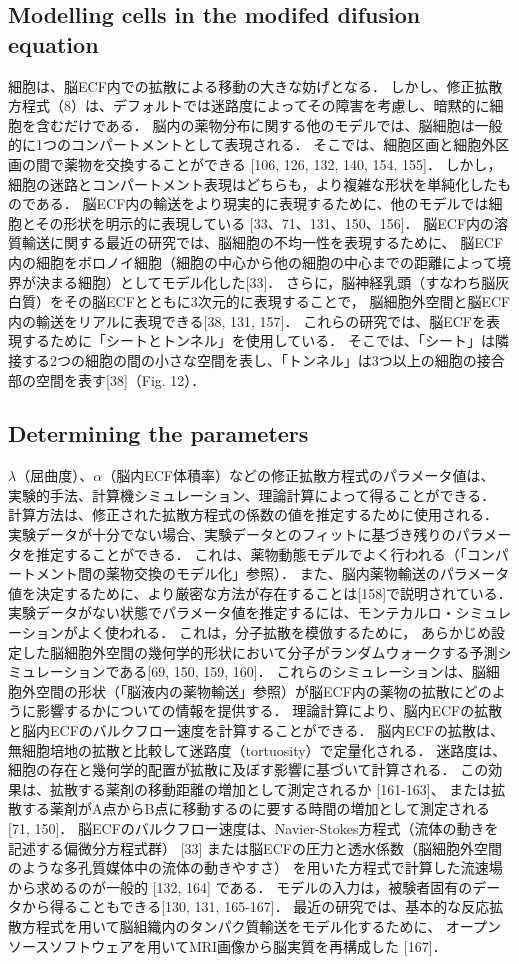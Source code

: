 \documentclass[11pt,a4paper]{jsarticle}
\begin{document}
\subsection{Modelling cells in the modifed difusion equation}
細胞は、脳ECF内での拡散による移動の大きな妨げとなる．
しかし、修正拡散方程式（8）は、デフォルトでは迷路度によってその障害を考慮し、暗黙的に細胞を含むだけである．
脳内の薬物分布に関する他のモデルでは、脳細胞は一般的に1つのコンパートメントとして表現される．
そこでは、細胞区画と細胞外区画の間で薬物を交換することができる [106, 126, 132, 140, 154, 155]．
しかし，細胞の迷路とコンパートメント表現はどちらも，より複雑な形状を単純化したものである．
脳ECF内の輸送をより現実的に表現するために、他のモデルでは細胞とその形状を明示的に表現している [33、71、131、150、156]．
脳ECF内の溶質輸送に関する最近の研究では、脳細胞の不均一性を表現するために、
脳ECF内の細胞をボロノイ細胞（細胞の中心から他の細胞の中心までの距離によって境界が決まる細胞）としてモデル化した[33]．
さらに，脳神経乳頭（すなわち脳灰白質）をその脳ECFとともに3次元的に表現することで，
脳細胞外空間と脳ECF内の輸送をリアルに表現できる[38, 131, 157]．
これらの研究では、脳ECFを表現するために「シートとトンネル」を使用している．
そこでは、「シート」は隣接する2つの細胞の間の小さな空間を表し、「トンネル」は3つ以上の細胞の接合部の空間を表す[38]（Fig. 12）．
\subsection{Determining the parameters}
$\lambda$（屈曲度）、$\alpha$（脳内ECF体積率）などの修正拡散方程式のパラメータ値は、
実験的手法、計算機シミュレーション、理論計算によって得ることができる．
計算方法は、修正された拡散方程式の係数の値を推定するために使用される．
実験データが十分でない場合、実験データとのフィットに基づき残りのパラメータを推定することができる．
これは、薬物動態モデルでよく行われる（「コンパートメント間の薬物交換のモデル化」参照）．
また、脳内薬物輸送のパラメータ値を決定するために、より厳密な方法が存在することは[158]で説明されている．
実験データがない状態でパラメータ値を推定するには、モンテカルロ・シミュレーションがよく使われる．
これは，分子拡散を模倣するために，
あらかじめ設定した脳細胞外空間の幾何学的形状において分子がランダムウォークする予測シミュレーションである[69, 150, 159, 160]．
これらのシミュレーションは、脳細胞外空間の形状（「脳液内の薬物輸送」参照）が脳ECF内の薬物の拡散にどのように影響するかについての情報を提供する．
理論計算により、脳内ECFの拡散と脳内ECFのバルクフロー速度を計算することができる．
脳内ECFの拡散は、無細胞培地の拡散と比較して迷路度（tortuosity）で定量化される．
迷路度は、細胞の存在と幾何学的配置が拡散に及ぼす影響に基づいて計算される．
この効果は、拡散する薬剤の移動距離の増加として測定されるか [161-163]、
または拡散する薬剤がA点からB点に移動するのに要する時間の増加として測定される [71, 150]．
脳ECFのバルクフロー速度は、Navier-Stokes方程式（流体の動きを記述する偏微分方程式群） [33] 
または脳ECFの圧力と透水係数（脳細胞外空間のような多孔質媒体中の流体の動きやすさ）
を用いた方程式で計算した流速場から求めるのが一般的 [132, 164] である．
モデルの入力は，被験者固有のデータから得ることもできる[130, 131, 165-167]．
最近の研究では、基本的な反応拡散方程式を用いて脳組織内のタンパク質輸送をモデル化するために、
オープンソースソフトウェアを用いてMRI画像から脳実質を再構成した [167]．
\end{document}
